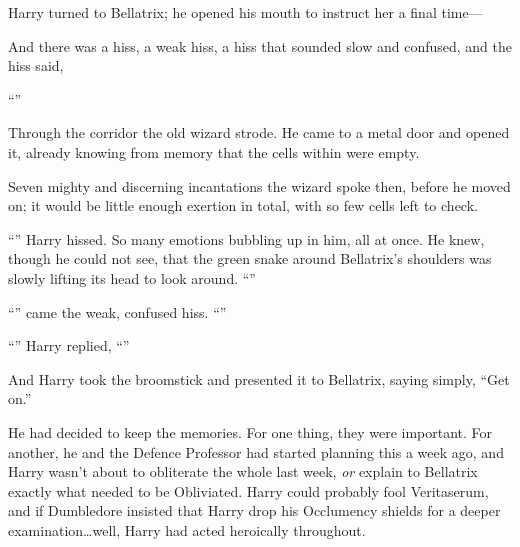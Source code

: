 Harry turned to Bellatrix; he opened his mouth to instruct her a final time—

And there was a hiss, a weak hiss, a hiss that sounded slow and confused, and the hiss said,

“”

\later

Through the corridor the old wizard strode. He came to a metal door and opened it, already knowing from memory that the cells within were empty.

Seven mighty and discerning incantations the wizard spoke then, before he moved on; it would be little enough exertion in total, with so few cells left to check.

\later

“” Harry hissed. So many emotions bubbling up in him, all at once. He knew, though he could not see, that the green snake around Bellatrix’s shoulders was slowly lifting its head to look around. “”

“” came the weak, confused hiss. “”

“” Harry replied, “”

And Harry took the broomstick and presented it to Bellatrix, saying simply, “Get on.”

He had decided to keep the memories. For one thing, they were important. For another, he and the Defence Professor had started planning this a week ago, and Harry wasn’t about to obliterate the whole last week, \emph{or} explain to Bellatrix exactly what needed to be Obliviated. Harry could probably fool Veritaserum, and if Dumbledore insisted that Harry drop his Occlumency shields for a deeper examination…well, Harry had acted heroically throughout.

